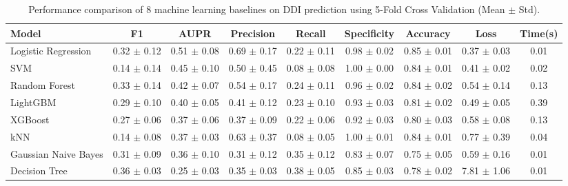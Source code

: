 \begin{table}[htbp]
\centering
\caption{Performance comparison of 8 machine learning baselines on DDI prediction using 5-Fold Cross Validation (Mean $\pm$ Std).}
\label{tab:ddi_baselines_cv}
\begin{tabular}{lcccccccc}
\toprule
Model & F1 & AUPR & Precision & Recall & Specificity & Accuracy & Loss & Time(s) \\
\midrule
Logistic Regression & 0.32 $\pm$ 0.12 & 0.51 $\pm$ 0.08 & 0.69 $\pm$ 0.17 & 0.22 $\pm$ 0.11 & 0.98 $\pm$ 0.02 & 0.85 $\pm$ 0.01 & 0.37 $\pm$ 0.03 & 0.01 \\
SVM & 0.14 $\pm$ 0.14 & 0.45 $\pm$ 0.10 & 0.50 $\pm$ 0.45 & 0.08 $\pm$ 0.08 & 1.00 $\pm$ 0.00 & 0.84 $\pm$ 0.01 & 0.41 $\pm$ 0.02 & 0.02 \\
Random Forest & 0.33 $\pm$ 0.14 & 0.42 $\pm$ 0.07 & 0.54 $\pm$ 0.17 & 0.24 $\pm$ 0.11 & 0.96 $\pm$ 0.02 & 0.84 $\pm$ 0.02 & 0.54 $\pm$ 0.14 & 0.13 \\
LightGBM & 0.29 $\pm$ 0.10 & 0.40 $\pm$ 0.05 & 0.41 $\pm$ 0.12 & 0.23 $\pm$ 0.10 & 0.93 $\pm$ 0.03 & 0.81 $\pm$ 0.02 & 0.49 $\pm$ 0.05 & 0.39 \\
XGBoost & 0.27 $\pm$ 0.06 & 0.37 $\pm$ 0.06 & 0.37 $\pm$ 0.09 & 0.22 $\pm$ 0.06 & 0.92 $\pm$ 0.03 & 0.80 $\pm$ 0.03 & 0.58 $\pm$ 0.08 & 0.13 \\
kNN & 0.14 $\pm$ 0.08 & 0.37 $\pm$ 0.03 & 0.63 $\pm$ 0.37 & 0.08 $\pm$ 0.05 & 1.00 $\pm$ 0.01 & 0.84 $\pm$ 0.01 & 0.77 $\pm$ 0.39 & 0.04 \\
Gaussian Naive Bayes & 0.31 $\pm$ 0.09 & 0.36 $\pm$ 0.10 & 0.31 $\pm$ 0.12 & 0.35 $\pm$ 0.12 & 0.83 $\pm$ 0.07 & 0.75 $\pm$ 0.05 & 0.59 $\pm$ 0.16 & 0.01 \\
Decision Tree & 0.36 $\pm$ 0.03 & 0.25 $\pm$ 0.03 & 0.35 $\pm$ 0.03 & 0.38 $\pm$ 0.05 & 0.85 $\pm$ 0.03 & 0.78 $\pm$ 0.02 & 7.81 $\pm$ 1.06 & 0.01 \\
\bottomrule
\end{tabular}
\end{table}